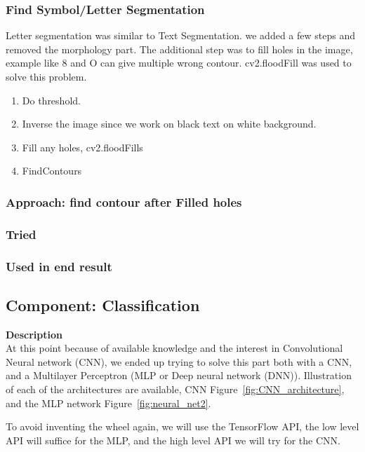 \documentclass[11pt,a4paper,UKenglish]{article}
\begin{document}
\subsubsection{Find Symbol/Letter Segmentation}
Letter segmentation was similar to Text Segmentation. we added a few steps and removed the morphology part. The additional step was to fill holes in the image, example like 8 and O can give multiple wrong contour. cv2.floodFill was used to solve this problem.
\begin{enumerate}
  \item Do threshold.
  \item Inverse the image since we work on black text on white background.
  \item Fill any holes, cv2.floodFills
  \item FindContours
\end{enumerate}
\subsubsection{Approach: find contour after Filled holes}



\subsubsection{Tried}
\subsubsection{Used in end result}

\subsection{Component: Classification}
\label{Method:Classification}
\textbf{Description} \\
At this point because of available knowledge and the interest in
Convolutional Neural network (CNN), we ended up trying to solve this part
both with a CNN, and a Multilayer Perceptron (MLP or Deep neural network (DNN)).
Illustration of each of the architectures are available, CNN Figure~\ref{fig:CNN_architecture},
and the MLP network Figure~\ref{fig:neural_net2}. \par
To avoid inventing the wheel again, we will use the TensorFlow API, the low
level API will suffice for the MLP, and the high level API we will try for the
CNN.
\end{document}
